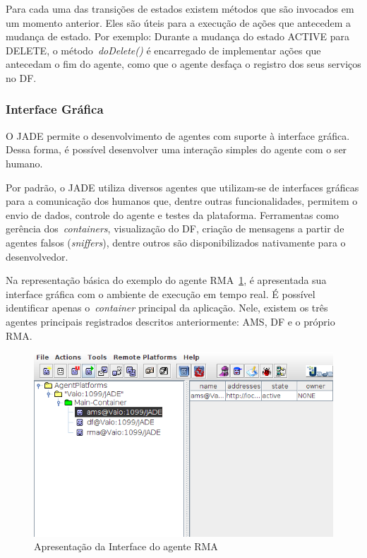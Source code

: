 Para cada uma das transições de estados existem métodos que são invocados em um momento anterior. Eles são úteis para a execução de ações que antecedem a mudança de estado. Por exemplo: Durante a mudança do estado ACTIVE para DELETE, o método~\emph{doDelete()} é encarregado de implementar ações que antecedam o fim do agente, como que o agente desfaça o registro dos seus serviços no DF.

\subsubsection{Interface Gráfica}
O JADE permite o desenvolvimento de agentes com suporte à interface gráfica. Dessa forma, é possível desenvolver uma interação simples do agente com o ser humano.


Por padrão, o JADE utiliza diversos agentes que utilizam-se de interfaces gráficas para a comunicação dos humanos que, dentre outras funcionalidades, permitem o envio de dados, controle do agente e testes da plataforma. Ferramentas como gerência dos~\emph{containers}, visualização do DF, criação de mensagens a partir de agentes falsos (\emph{sniffers}), dentre outros são disponibilizados nativamente para o desenvolvedor.

Na representação básica do exemplo do agente RMA~\ref{fig:tela-jade}, é apresentada sua interface gráfica com o ambiente de execução em tempo real. É possível identificar apenas o~\emph{container} principal da aplicação. Nele, existem os três agentes principais registrados descritos anteriormente: AMS, DF e o próprio RMA.
\begin{figure}
	\centering
	\includegraphics[scale=0.65]{images/tela-jade.png}
	\caption{Apresentação da Interface do agente RMA}
	\label{fig:tela-jade}
\end{figure}

